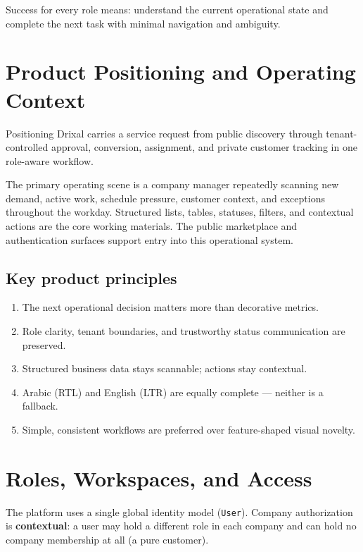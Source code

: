 \documentclass[11pt,a4paper]{article}
\begin{document}
Success for every role means: understand the current operational state and complete the next task with minimal navigation and ambiguity.

\section{Product Positioning and Operating Context}
\label{sec:positioning}

\begin{definitionbox}{Positioning}
  Drixal carries a service request from public discovery through tenant-controlled approval, conversion, assignment, and private customer tracking in one role-aware workflow.
\end{definitionbox}

The primary operating scene is a company manager repeatedly scanning new demand, active work, schedule pressure, customer context, and exceptions throughout the workday. Structured lists, tables, statuses, filters, and contextual actions are the core working materials. The public marketplace and authentication surfaces support entry into this operational system.

\subsection{Key product principles}
\begin{enumerate}[leftmargin=2em, itemsep=2pt]
  \item The next operational decision matters more than decorative metrics.
  \item Role clarity, tenant boundaries, and trustworthy status communication are preserved.
  \item Structured business data stays scannable; actions stay contextual.
  \item Arabic (RTL) and English (LTR) are equally complete --- neither is a fallback.
  \item Simple, consistent workflows are preferred over feature-shaped visual novelty.
\end{enumerate}

\section{Roles, Workspaces, and Access}
\label{sec:roles}

The platform uses a single global identity model (\texttt{User}). Company authorization is \textbf{contextual}: a user may hold a different role in each company and can hold no company membership at all (a pure customer).
\end{document}
